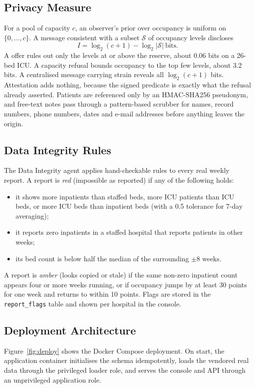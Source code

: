 \subsection{Privacy Measure}
\label{sec:privacy}
For a pool of capacity $c$, an observer's prior over occupancy is uniform on $\{0,\dots,c\}$. A message consistent with a subset $\mathcal{S}$ of occupancy levels discloses
\begin{equation}
  I = \log_2(c+1) - \log_2|\mathcal{S}|\ \text{bits}.
  \label{eq:bits}
\end{equation}
A \mahros{} offer rules out only the levels at or above the reserve, about 0.06 bits on a 26-bed ICU. A capacity refusal bounds occupancy to the top few levels, about 3.2 bits. A centralised message carrying strain reveals all $\log_2(c+1)$ bits. Attestation adds nothing, because the signed predicate is exactly what the refusal already asserted. Patients are referenced only by an HMAC-SHA256 pseudonym, and free-text notes pass through a pattern-based scrubber for names, record numbers, phone numbers, dates and e-mail addresses before anything leaves the origin.

\subsection{Data Integrity Rules}
\label{sec:integrity-rules}
The Data Integrity agent applies hand-checkable rules to every real weekly report. A report is \emph{red} (impossible as reported) if any of the following holds:
\begin{itemize}
\setlength{\itemsep}{0pt}
\item it shows more inpatients than staffed beds, more ICU patients than ICU beds, or more ICU beds than inpatient beds (with a 0.5 tolerance for 7-day averaging);
\item it reports zero inpatients in a staffed hospital that reports patients in other weeks;
\item its bed count is below half the median of the surrounding $\pm8$ weeks.
\end{itemize}
A report is \emph{amber} (looks copied or stale) if the same non-zero inpatient count appears four or more weeks running, or if occupancy jumps by at least 30 points for one week and returns to within 10 points. Flags are stored in the \texttt{report\_flags} table and shown per hospital in the console.

\subsection{Deployment Architecture}
Figure~\ref{fig:deploy} shows the Docker Compose deployment. On start, the application container initialises the schema idempotently, loads the vendored real data through the privileged loader role, and serves the console and API through an unprivileged application role.


